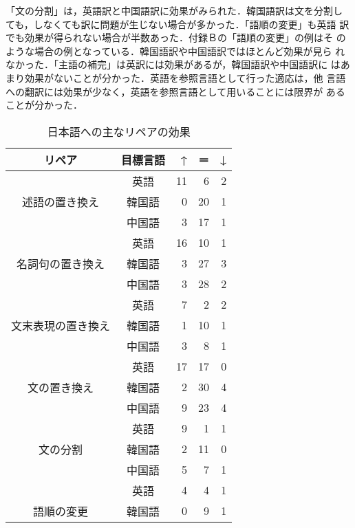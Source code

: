「文の分割」は，英語訳と中国語訳に効果がみられた．韓国語訳は文を分割し
ても，しなくても訳に問題が生じない場合が多かった．「語順の変更」も英語
訳でも効果が得られない場合が半数あった．付録Ｂの「語順の変更」の例はそ
のような場合の例となっている．韓国語訳や中国語訳ではほとんど効果が見ら
れなかった．「主語の補完」は英訳には効果があるが，韓国語訳や中国語訳に
はあまり効果がないことが分かった．英語を参照言語として行った適応は，他
言語への翻訳には効果が少なく，英語を参照言語として用いることには限界が
あることが分かった．

\begin{table}[htbp]
    \leavevmode
\small
    \caption{日本語への主なリペアの効果}
    \label{Table:Main_repair_Effect}
    \vspace*{-3mm}
\begin {center}
\begin{tabular}{|c|c|r|r|r|}
\hline
{\bf リペア} & {\bf 目標言語} & {\bf ↑} & {\bf ＝} & {\bf ↓}  \\
\hline
                   & 英語   & 11 &  6 &  2 \\
\cline{2-5}
述語の置き換え     & 韓国語 &  0 & 20 &  1 \\
\cline{2-5}
                   & 中国語 &  3 & 17 &  1 \\
\hline 
                   & 英語   & 16 & 10 &  1 \\
\cline{2-5}
名詞句の置き換え     & 韓国語 &  3 & 27 &  3 \\
\cline{2-5}
                   & 中国語 &  3 & 28 &  2 \\
\hline 
                   & 英語   &  7 &  2 &  2 \\
\cline{2-5}
文末表現の置き換え & 韓国語 &  1 & 10 &  1 \\
\cline{2-5}
                   & 中国語 &  3 &  8 &  1 \\
\hline 
                   & 英語   & 17 & 17 &  0 \\
\cline{2-5}
文の置き換え       & 韓国語 &  2 & 30 &  4 \\
\cline{2-5}
                   & 中国語 &  9 & 23 &  4 \\
\hline 
                   & 英語   &  9 &  1 &  1 \\
\cline{2-5}
文の分割           & 韓国語 &  2 & 11 &  0 \\
\cline{2-5}
                   & 中国語 &  5 &  7 &  1 \\
\hline 
                   & 英語   &  4 &  4 &  1 \\
\cline{2-5}
語順の変更         & 韓国語 &  0 &  9 &  1 \\

\end{tabular}
\end{center}
\end{table}
